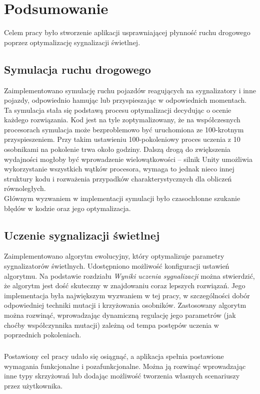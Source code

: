 \chapter*{Podsumowanie}
Celem pracy było stworzenie aplikacji usprawniającej płynność ruchu drogowego poprzez optymalizację sygnalizacji świetlnej.
\section*{Symulacja ruchu drogowego}
Zaimplementowano symulację ruchu pojazdów reagujących na sygnalizatory i inne pojazdy, odpowiednio hamując lub przyspieszając w odpowiednich momentach. Ta symulacja stała się podstawą procesu optymalizacji decydując o ocenie każdego rozwiązania. Kod jest na tyle zoptymalizowany, że na współczesnych procesorach symulacja może bezproblemowo być uruchomiona ze 100-krotnym przyspieszeniem. Przy takim ustawieniu 100-pokoleniowy proces uczenia z 10 osobnikami na pokolenie trwa około godziny. Dalszą drogą do zwiększenia wydajności mogłoby być wprowadzenie wielowątkowości -- silnik Unity umożliwia wykorzystanie wszystkich wątków procesora, wymaga to jednak nieco innej struktury kodu i rozważenia przypadków charakterystycznych dla obliczeń równoległych.\\
Głównym wyzwaniem w implementacji symulacji było czasochłonne szukanie błędów w kodzie oraz jego optymalizacja.
\section*{Uczenie sygnalizacji świetlnej}
Zaimplementowano algorytm ewolucyjny, który optymalizuje parametry sygnalizatorów świetlnych. Udostępniono możliwość konfiguracji ustawień algorytmu. Na podstawie rozdziału \textit{Wyniki uczenia sygnalizacji} można stwierdzić, że algorytm jest dość skuteczny w znajdowaniu coraz lepszych rozwiązań. Jego implementacja była największym wyzwaniem w tej pracy, w szczególności dobór odpowiedniej techniki mutacji i krzyżowania osobników. Zastosowany algorytm można rozwinąć, wprowadzając dynamiczną regulację jego parametrów (jak choćby współczynnika mutacji) zależną od tempa postępów uczenia w poprzednich pokoleniach.
\paragraph{} 
Postawiony cel pracy udało się osiągnąć, a aplikacja spełnia postawione wymagania funkcjonalne i pozafunkcjonalne. Można ją rozwinąć wprowadzając inne typy skrzyżowań lub dodając możliwość tworzenia własnych scenariuszy przez użytkownika.